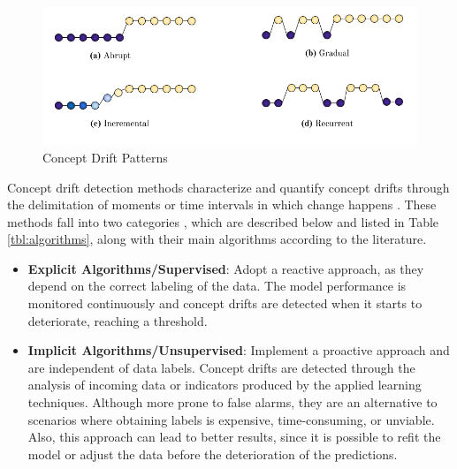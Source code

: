 \documentclass[preprint,12pt]{elsarticle}
\begin{document}
\begin{figure}[h!]
\begin{center}
    \includegraphics[scale=0.7]{img/concept_drift_patterns.png}
    \caption{Concept Drift Patterns}
    \label{fig:concept_drift_patterns}
\end{center}
\end{figure}

Concept drift detection methods characterize and quantify concept drifts through the delimitation of moments or time intervals in which change happens \cite{Basseville:1993:DAC:151741}.
%
These methods fall into two categories \cite{Zliobaite:2010},
which are described below and listed in Table \ref{tbl:algorithms}, along with their main algorithms according to the literature.

\begin{itemize}
    \item \textbf{Explicit Algorithms/Supervised}: Adopt a reactive approach, as they depend on the correct labeling of the data.
    The model performance is monitored continuously and concept drifts are detected when it starts to deteriorate, reaching a threshold.
    \item \textbf{Implicit Algorithms/Unsupervised}: Implement a proactive approach and are independent of data labels.
    Concept drifts are detected through the analysis of incoming data or indicators produced by the applied learning techniques.
    Although more prone to false alarms, they are an alternative to scenarios where obtaining labels is expensive, time-consuming, or unviable.
    Also, this approach can lead to better results, since it is possible to refit the model or adjust the data before the deterioration of the predictions.
\end{itemize}
\end{document}
